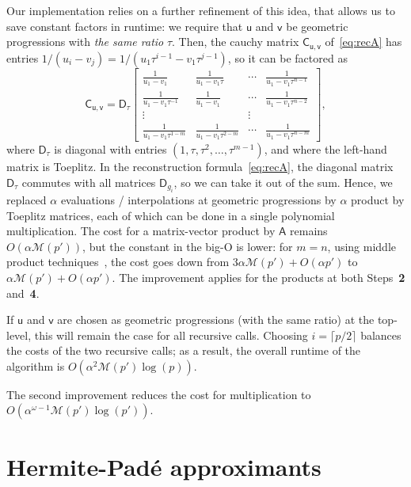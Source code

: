 \documentclass{sig-alternate}
\newcommand{\vu}{\ensuremath{\mathsf{u}}}
\newcommand{\vv}{\ensuremath{\mathsf{v}}}
\newcommand{\mA}{\ensuremath{\mathsf{A}}}
\newcommand{\mC}{\ensuremath{\mathsf{C}}}
\newcommand{\mD}{\ensuremath{\mathsf{D}}}
\newcommand{\M}{\ensuremath{\mathscr{M}}}
\begin{document}
Our implementation relies on a further refinement of this idea, that
allows us to save constant factors in runtime: we require that $\vu$
and $\vv$ be geometric progressions with {\em the same ratio}
$\tau$. Then, the cauchy matrix $\mC_{\vu,\vv}$ of~\eqref{eq:recA} has
entries $1/(u_i - v_j) = 1/(u_1 \tau^{i-1} - v_1 \tau^{j-1})$, so it
can be factored as
$$\mC_{\vu,\vv}=\mD_\tau
\begin{bmatrix}
\frac 1{u_1 - v_1} & \frac 1{u_1 - v_1 \tau} & \cdots & \frac 1{u_1-v_1 \tau^{n-1}}\\
\frac 1{u_1 - v_1 \tau^{-1}}  & \frac 1{u_1 - v_1} & \cdots & \frac 1{u_1-v_1 \tau^{n-2}}\\
\vdots & & \vdots \\
\frac 1{u_1 - v_1 \tau^{1-m}}  & \frac 1{u_1 - v_1 \tau^{2-m}} & \cdots & \frac 1{u_1-v_1 \tau^{n-m}}
\end{bmatrix},$$
where $\mD_{\tau}$ is diagonal with entries
$(1,\tau,\tau^{2},\dots,\tau^{m-1})$, and where the left-hand matrix
is Toeplitz. In the reconstruction formula~\eqref{eq:recA}, the
diagonal matrix $\mD_\tau$ commutes with all matrices $\mD_{g_i}$, so
we can take it out of the sum. Hence, we replaced $\alpha$ evaluations
/ interpolations at geometric progressions by $\alpha$ product by
Toeplitz matrices, each of which can be done in a single polynomial
multiplication. The cost for a matrix-vector product by $\mA$ remains
$O(\alpha \M(p'))$, but the constant in the big-O is lower: for $m=n$,
using middle product techniques~\cite{HaQuZi04,BoLeSc03,BoSc05}, the
cost goes down from $3\alpha \M(p') +O(\alpha p')$ to $\alpha \M(p')
+O(\alpha p')$. The improvement applies for the products at
both Steps~{\bf 2} and~{\bf 4}.

If $\vu$ and $\vv$ are chosen as geometric progressions (with the same
ratio) at the top-level, this will remain the case for all recursive
calls. Choosing $i=\lceil p/2\rceil$ balances the costs of the two
recursive calls; as a result, the overall runtime of the algorithm is
$O(\alpha^2 \M(p') \log(p))$.

The second improvement reduces the cost for multiplication 
to $O(\alpha^{\omega-1} \M(p')\log(p'))$.




\section{Hermite-Pad\'e approximants}
\end{document}

